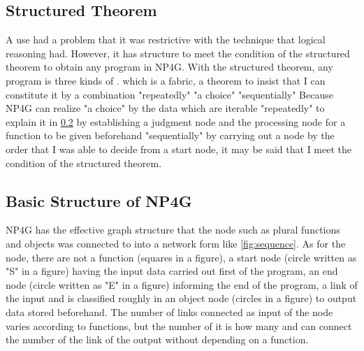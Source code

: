 \documentclass{article}
\begin{document}
\subsection {Structured Theorem}
A use had a problem that it was restrictive with the technique that logical reasoning had.
However, it has structure to meet the condition of the structured theorem to obtain any program in NP4G.
With the structured theorem, any program is three kinds of \cite{StructuredProgramming}. which is a fabric, a theorem to insist that I can constitute it by a combination "repeatedly" "a choice" "sequentially"
Because NP4G can realize "a choice" by the data which are iterable "repeatedly" to explain it in \ref{sec:struct} by establishing a judgment node and the processing node for a function to be given beforehand "sequentially" by carrying out a node by the order that I was able to decide from a start node, it may be said that I meet the condition of the structured theorem.
\subsection{Basic Structure of NP4G}
\label{sec:struct}
NP4G has the effective graph structure that the node such as plural functions and objects was connected to into a network form like \ref{fig:sequence}.
As for the node, there are not a function (squares in a figure), a start node (circle written as "S" in a figure) having the input data carried out first of the program, an end node (circle written as "E" in a figure) informing the end of the program, a link of the input and is classified roughly in an object node (circles in a figure) to output data stored beforehand.
The number of links connected as input of the node varies according to functions, but the number of it is how many and can connect the number of the link of the output without depending on a function.
\end{document}
